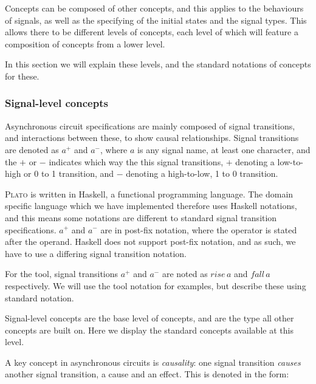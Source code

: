 \documentclass[british,conference,compsoc]{IEEEtran}
\newcommand{\noun}[1]{\textsc{#1}}
\begin{document}
\vspace{-3mm}

Concepts can be composed of other concepts, and this applies to the behaviours 
of signals, as well as the specifying of the initial states and the signal 
types. This allows there to be different levels of concepts, each level of 
which will feature a composition of concepts from a lower level. 

In this section we will explain these levels, and the standard notations of 
concepts for these. 

\vspace{-2mm}

\subsubsection{\label{signal-level}Signal-level concepts}Asynchronous circuit 
specifications are mainly composed of signal transitions, and interactions 
between these, to show causal relationships. Signal transitions are denoted as 
$a^{+}$ and $a^{-}$, where $a$ is any signal name, at least one character, and 
the $+$ or $-$ indicates which way the this signal transitions, $+$ denoting a 
low-to-high or 0 to 1 transition, and $-$ denoting a high-to-low, 1 to 0 
transition. 

\noun{Plato} is written in Haskell, a functional programming language. The 
domain specific language which we have implemented therefore uses Haskell 
notations, and this means some notations are different to standard signal 
transition specifications. $a^{+}$ and $a^{-}$ are in post-fix notation, where 
the operator is stated after the operand. Haskell does not support post-fix 
notation, and as such, we have to use a differing signal transition notation. 

For the tool, signal transitions $a^{+}$ and $a^{-}$ are noted as $rise\,a$ and 
$fall\,a$ respectively. We will use the tool notation for examples, but 
describe these using standard notation.

Signal-level concepts are the base level of concepts, and are 
the type all other concepts are built on. Here we display the standard concepts
available at this level.

A key concept in asynchronous circuits is \emph{causality}:
one signal transition \emph{causes} another signal transition, a cause and an 
effect. This is denoted in the form: 

\vspace{-3mm}
\end{document}
